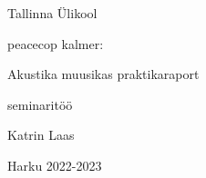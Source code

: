 \begin{titlepage}
\par{Tallinna Ülikool}
\vspace{0.3\textheight}
\par{peacecop kalmer:}
\LARGE
\par{Akustika muusikas praktikaraport}
\normalsize
\par{seminaritöö}
\vspace{0.3\textheight}
\begin{flushright}
\par{Katrin Laas}
\end{flushright}
		\vfill
Harku
\hfill
2022-2023
\end{titlepage}

